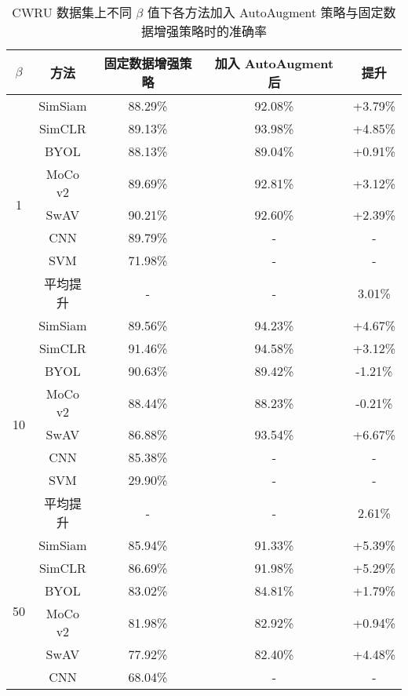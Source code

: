 \documentclass[master]{thesis-uestc}
\begin{document}
\begin{table}[htbp!]
    \caption{CWRU 数据集上不同 $\beta$ 值下各方法加入 AutoAugment 策略与固定数据增强策略时的准确率}
    \centering
    \renewcommand\arraystretch{1.2}
    \begin{tabular}{ccccc}
        \toprule
        $\beta$ & 方法 & 固定数据增强策略 & 加入 AutoAugment 后 & 提升 \\
        \midrule
        \multirow{8}{*}{1} 
            & SimSiam & 88.29\% & 92.08\% & +3.79\% \\
            & SimCLR  & 89.13\% & 93.98\% & +4.85\% \\
            & BYOL    & 88.13\% & 89.04\% & +0.91\% \\
            & MoCo v2 & 89.69\% & 92.81\% & +3.12\% \\
            & SwAV    & 90.21\% & 92.60\% & +2.39\% \\
            & CNN     & 89.79\% & -       & -       \\
            & SVM     & 71.98\% & -       & -       \\
            & 平均提升 & - & - & 3.01\% \\
        \midrule
        \multirow{8}{*}{10} 
            & SimSiam & 89.56\% & 94.23\% & +4.67\% \\
            & SimCLR  & 91.46\% & 94.58\% & +3.12\% \\
            & BYOL    & 90.63\% & 89.42\% & -1.21\% \\
            & MoCo v2 & 88.44\% & 88.23\% & -0.21\% \\
            & SwAV    & 86.88\% & 93.54\% & +6.67\% \\
            & CNN     & 85.38\% & -       & -       \\
            & SVM     & 29.90\% & -       & -       \\
            & 平均提升 & - & - & 2.61\% \\
        \midrule
        \multirow{8}{*}{50} 
            & SimSiam & 85.94\% & 91.33\% & +5.39\% \\
            & SimCLR  & 86.69\% & 91.98\% & +5.29\% \\
            & BYOL    & 83.02\% & 84.81\% & +1.79\% \\
            & MoCo v2 & 81.98\% & 82.92\% & +0.94\% \\
            & SwAV    & 77.92\% & 82.40\% & +4.48\% \\
            & CNN     & 68.04\% & -       & -       \\

\end{tabular}
\end{table}
\end{document}
